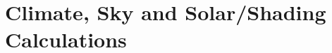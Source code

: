 \chapter{Climate, Sky and Solar/Shading Calculations}\label{climate-sky-and-solarshading-calculations}
